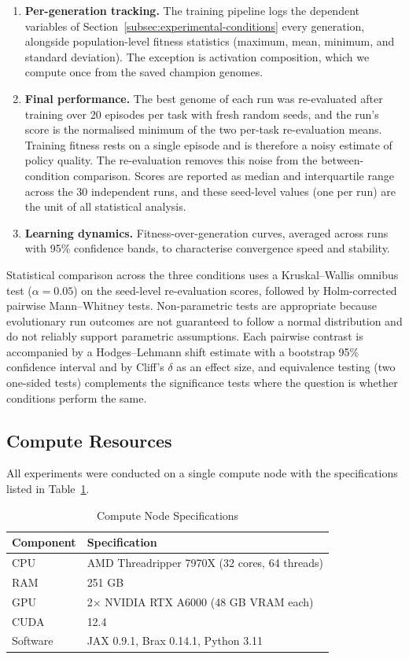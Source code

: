\documentclass[12pt]{article}
\begin{document}
\begin{enumerate}
    \item \textbf{Per-generation tracking.} The training pipeline logs the dependent variables of Section~\ref{subsec:experimental-conditions} every generation, alongside population-level fitness statistics (maximum, mean, minimum, and standard deviation). The exception is activation composition, which we compute once from the saved champion genomes.
    \item \textbf{Final performance.} The best genome of each run was re-evaluated after training over 20 episodes per task with fresh random seeds, and the run's score is the normalised minimum of the two per-task re-evaluation means. Training fitness rests on a single episode and is therefore a noisy estimate of policy quality. The re-evaluation removes this noise from the between-condition comparison. Scores are reported as median and interquartile range across the 30 independent runs, and these seed-level values (one per run) are the unit of all statistical analysis.
    \item \textbf{Learning dynamics.} Fitness-over-generation curves, averaged across runs with 95\% confidence bands, to characterise convergence speed and stability.
\end{enumerate}

Statistical comparison across the three conditions uses a Kruskal--Wallis omnibus test ($\alpha = 0.05$) on the seed-level re-evaluation scores, followed by Holm-corrected pairwise Mann--Whitney tests.
Non-parametric tests are appropriate because evolutionary run outcomes are not guaranteed to follow a normal distribution and do not reliably support parametric assumptions.
Each pairwise contrast is accompanied by a Hodges--Lehmann shift estimate with a bootstrap 95\% confidence interval and by Cliff's $\delta$ as an effect size, and equivalence testing (two one-sided tests) complements the significance tests where the question is whether conditions perform the same.

\subsection{Compute Resources}
\label{subsec:compute-resources}

All experiments were conducted on a single compute node with the specifications listed in Table~\ref{tab:compute-node}.

\begin{table}[h]
\centering
\caption{Compute Node Specifications}
\label{tab:compute-node}
\begin{tabular}{ll}
\toprule
\textbf{Component} & \textbf{Specification} \\
\midrule
CPU & AMD Threadripper 7970X (32 cores, 64 threads) \\
RAM & 251 GB \\
GPU & 2$\times$ NVIDIA RTX A6000 (48 GB VRAM each) \\
CUDA & 12.4 \\
Software & JAX 0.9.1, Brax 0.14.1, Python 3.11 \\
\bottomrule
\end{tabular}
\end{table}
\end{document}
